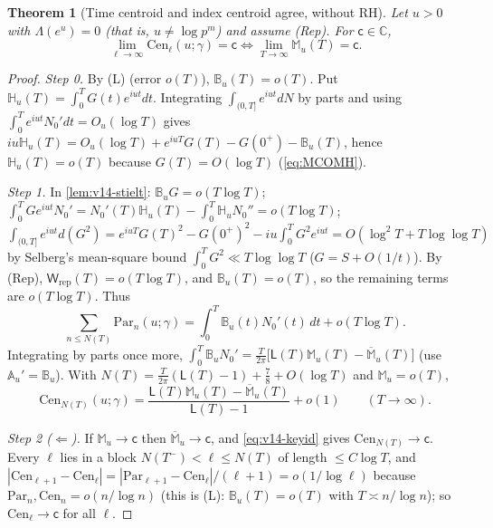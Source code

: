 \documentclass[11pt,a4paper]{article}
\numberwithin{equation}{section}
\newtheorem{theorem}{Theorem}[section]
\theoremstyle{definition}
\theoremstyle{remark}
\begin{document}
\begin{theorem}[Time centroid and index centroid agree, without RH]\label{thm:v14-transfer}
Let $u>0$ with $\Lambda(e^u)=0$ (that is, $u\ne\log p^m$) and assume (Rep). For $\mathsf c\in\mathbb C$,
\begin{equation}
\lim_{\ell\to\infty}\mathrm{Cen}_\ell(u;\gamma)=\mathsf c\iff\lim_{T\to\infty}\mathbb M_u(T)=\mathsf c .
\end{equation}
\end{theorem}
\begin{proof}
\emph{Step 0.} By (L) (error $o(T)$), $\mathbb B_u(T)=o(T)$. Put $\mathbb H_u(T)=\int_0^TG(t)e^{iut}dt$. Integrating $\int_{(0,T]}e^{iut}dN$ by parts and using $\int_0^Te^{iut}N_0'dt=O_u(\log T)$ gives $iu\mathbb H_u(T)=O_u(\log T)+e^{iuT}G(T)-G(0^+)-\mathbb B_u(T)$, hence $\mathbb H_u(T)=o(T)$ because $G(T)=O(\log T)$ (\eqref{eq:MCOMH}).

\emph{Step 1.} In \cref{lem:v14-stielt}: $\mathbb B_uG=o(T\log T)$; $\int_0^TGe^{iut}N_0'=N_0'(T)\mathbb H_u(T)-\int_0^T\mathbb H_uN_0''=o(T\log T)$; $\int_{(0,T]}e^{iut}d(G^2)=e^{iuT}G(T)^2-G(0^+)^2-iu\int_0^TG^2e^{iut}=O(\log^2T+T\log\log T)$ by Selberg's mean-square bound $\int_0^TG^2\ll T\log\log T$ \cite{Selberg1946} ($G=S+O(1/t)$). By (Rep), $\mathsf W_{\mathrm{rep}}(T)=o(T\log T)$, and $\mathbb B_u(T)=o(T)$, so the remaining terms are $o(T\log T)$. Thus
\begin{equation}
\sum_{n\le N(T)}\mathrm{Par}_n(u;\gamma)=\int_0^T\mathbb B_u(t)N_0'(t)\,dt+o(T\log T).
\end{equation}
Integrating by parts once more, $\int_0^T\mathbb B_uN_0'=\frac T{2\pi}\bigl[\mathsf L(T)\mathbb M_u(T)-\overline{\mathbb M}_u(T)\bigr]$ (use $\mathbb A_u'=\mathbb B_u$). With $N(T)=\frac T{2\pi}(\mathsf L(T)-1)+\frac78+O(\log T)$ and $\mathbb M_u=o(T)$,
\begin{equation}\label{eq:v14-keyid}
\mathrm{Cen}_{N(T)}(u;\gamma)=\frac{\mathsf L(T)\mathbb M_u(T)-\overline{\mathbb M}_u(T)}{\mathsf L(T)-1}+o(1)\qquad(T\to\infty).
\end{equation}

\emph{Step 2 ($\Leftarrow$).} If $\mathbb M_u\to\mathsf c$ then $\overline{\mathbb M}_u\to\mathsf c$, and \eqref{eq:v14-keyid} gives $\mathrm{Cen}_{N(T)}\to\mathsf c$. Every $\ell$ lies in a block $N(T^-)<\ell\le N(T)$ of length $\le C\log T$, and $|\mathrm{Cen}_{\ell+1}-\mathrm{Cen}_\ell|=|\mathrm{Par}_{\ell+1}-\mathrm{Cen}_\ell|/(\ell+1)=o(1/\log\ell)$ because $\mathrm{Par}_n,\mathrm{Cen}_n=o(n/\log n)$ (this is (L): $\mathbb B_u(T)=o(T)$ with $T\asymp n/\log n$); so $\mathrm{Cen}_\ell\to\mathsf c$ for all $\ell$.


\end{proof}
\end{document}
